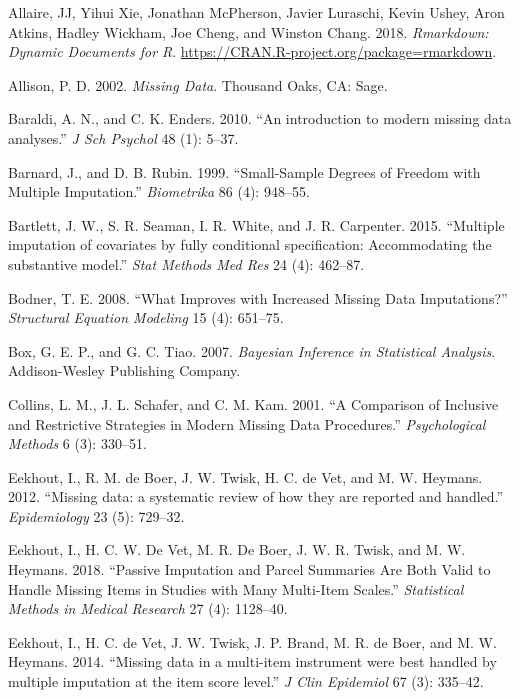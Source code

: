 \documentclass[
]{book}
\begin{document}
\hypertarget{refs}{}
\leavevmode\hypertarget{ref-R-rmarkdown}{}%
Allaire, JJ, Yihui Xie, Jonathan McPherson, Javier Luraschi, Kevin
Ushey, Aron Atkins, Hadley Wickham, Joe Cheng, and Winston Chang. 2018.
\emph{Rmarkdown: Dynamic Documents for R}.
\url{https://CRAN.R-project.org/package=rmarkdown}.

\leavevmode\hypertarget{ref-Allison2002}{}%
Allison, P. D. 2002. \emph{Missing Data}. Thousand Oaks, CA: Sage.

\leavevmode\hypertarget{ref-Baraldi2010}{}%
Baraldi, A. N., and C. K. Enders. 2010. ``An introduction to modern
missing data analyses.'' \emph{J Sch Psychol} 48 (1): 5--37.

\leavevmode\hypertarget{ref-BARNARD1999}{}%
Barnard, J., and D. B. Rubin. 1999. ``Small-Sample Degrees of Freedom
with Multiple Imputation.'' \emph{Biometrika} 86 (4): 948--55.

\leavevmode\hypertarget{ref-Bartlett2015}{}%
Bartlett, J. W., S. R. Seaman, I. R. White, and J. R. Carpenter. 2015.
``Multiple imputation of covariates by fully conditional specification:
Accommodating the substantive model.'' \emph{Stat Methods Med Res} 24
(4): 462--87.

\leavevmode\hypertarget{ref-Bodner2008}{}%
Bodner, T. E. 2008. ``What Improves with Increased Missing Data
Imputations?'' \emph{Structural Equation Modeling} 15 (4): 651--75.

\leavevmode\hypertarget{ref-box2007bayesianinferencein}{}%
Box, G. E. P., and G. C. Tiao. 2007. \emph{Bayesian Inference in
Statistical Analysis}. Addison-Wesley Publishing Company.

\leavevmode\hypertarget{ref-Collins2001}{}%
Collins, L. M., J. L. Schafer, and C. M. Kam. 2001. ``A Comparison of
Inclusive and Restrictive Strategies in Modern Missing Data
Procedures.'' \emph{Psychological Methods} 6 (3): 330--51.

\leavevmode\hypertarget{ref-Eekhout2012}{}%
Eekhout, I., R. M. de Boer, J. W. Twisk, H. C. de Vet, and M. W.
Heymans. 2012. ``Missing data: a systematic review of how they are
reported and handled.'' \emph{Epidemiology} 23 (5): 729--32.

\leavevmode\hypertarget{ref-Eekhout2018}{}%
Eekhout, I., H. C. W. De Vet, M. R. De Boer, J. W. R. Twisk, and M. W.
Heymans. 2018. ``Passive Imputation and Parcel Summaries Are Both Valid
to Handle Missing Items in Studies with Many Multi-Item Scales.''
\emph{Statistical Methods in Medical Research} 27 (4): 1128--40.

\leavevmode\hypertarget{ref-Eekhout2014}{}%
Eekhout, I., H. C. de Vet, J. W. Twisk, J. P. Brand, M. R. de Boer, and
M. W. Heymans. 2014. ``Missing data in a multi-item instrument were best
handled by multiple imputation at the item score level.'' \emph{J Clin
Epidemiol} 67 (3): 335--42.
\end{document}
